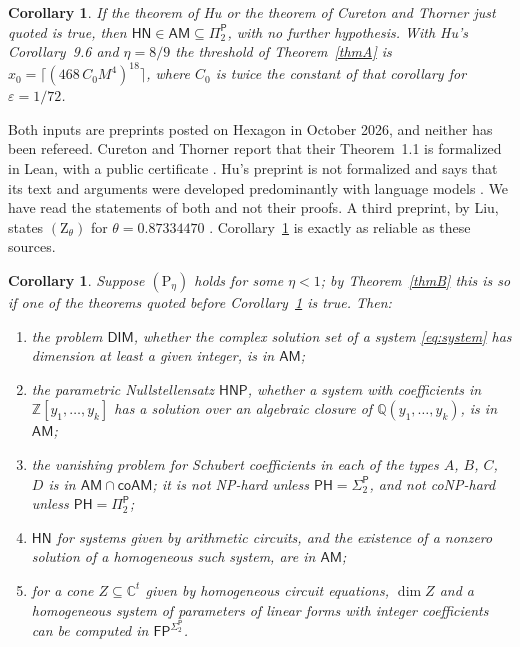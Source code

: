 \documentclass[11pt]{amsart}
\newtheorem{corollaryx}[theorem]{Corollary}
\theoremstyle{definition}
\theoremstyle{remark}
\newcommand{\Z}{\mathbb Z}
\newcommand{\Q}{\mathbb Q}
\newcommand{\C}{\mathbb C}
\newcommand{\cl}[1]{\mathsf{#1}}
\newcommand{\HN}{\cl{HN}}
\newcommand{\AM}{\cl{AM}}
\newcommand{\Pitwo}{\Pi_2^{\cl P}}
\newcommand{\Sigtwo}{\Sigma_2^{\cl P}}
\newcommand{\Zh}[1]{(\mathrm Z_{#1})}
\newcommand{\Ph}[1]{(\mathrm P_{#1})}
\begin{document}
\begin{corollaryx}\label{corC}
If the theorem of Hu or the theorem of Cureton and Thorner just quoted is true, then $\HN\in\AM\subseteq\Pitwo$, with no further hypothesis. With Hu's Corollary~9.6 and $\eta=8/9$ the threshold of Theorem~\ref{thmA} is $x_0=\lceil(468\,C_0M^4)^{18}\rceil$, where $C_0$ is twice the constant of that corollary for $\varepsilon=1/72$.
\end{corollaryx}

Both inputs are preprints posted on Hexagon in October 2026, and neither has been refereed. Cureton and Thorner report that their Theorem~1.1 is formalized in Lean, with a public certificate \cite[abstract and \S15]{CT}. Hu's preprint is not formalized and says that its text and arguments were developed predominantly with language models \cite[p.~58]{Hu}. We have read the statements of both and not their proofs. A third preprint, by Liu, states $\Zh\theta$ for $\theta=0.87334470$ \cite[Theorem~7.21]{Liu}. Corollary~\ref{corC} is exactly as reliable as these sources.

\begin{corollaryx}\label{corD}
Suppose $\Ph\eta$ holds for some $\eta<1$; by Theorem~\ref{thmB} this is so if one of the theorems quoted before Corollary~\ref{corC} is true. Then:
\begin{enumerate}
\item the problem $\cl{DIM}$, whether the complex solution set of a system \eqref{eq:system} has dimension at least a given integer, is in $\AM$;
\item the parametric Nullstellensatz $\cl{HNP}$, whether a system with coefficients in $\Z[y_1,\dots,y_k]$ has a solution over an algebraic closure of $\Q(y_1,\dots,y_k)$, is in $\AM$;
\item the vanishing problem for Schubert coefficients in each of the types $A$, $B$, $C$, $D$ is in $\AM\cap\cl{coAM}$; it is not NP-hard unless $\cl{PH}=\Sigtwo$, and not coNP-hard unless $\cl{PH}=\Pitwo$;
\item $\HN$ for systems given by arithmetic circuits, and the existence of a nonzero solution of a homogeneous such system, are in $\AM$;
\item for a cone $Z\subseteq\C^t$ given by homogeneous circuit equations, $\dim Z$ and a homogeneous system of parameters of linear forms with integer coefficients can be computed in $\cl{FP}^{\Sigtwo}$.
\end{enumerate}
\end{corollaryx}
\end{document}
